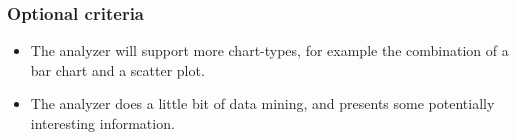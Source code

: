 \subsubsection{Optional criteria}
\begin{itemize}
\item The analyzer will support more chart-types, for example the combination of
a \gls{bar chart} and a \gls{scatter plot}. 
\item The analyzer does a little bit of data mining, and presents some potentially interesting information.
\end{itemize}






